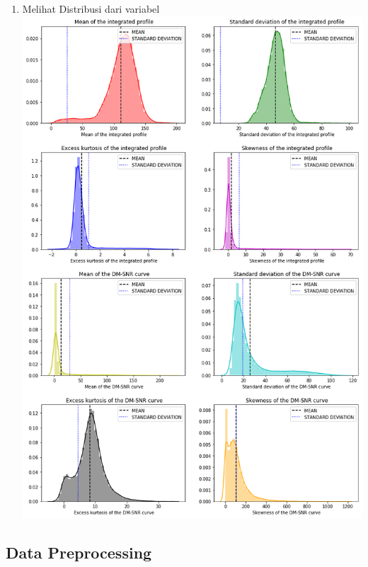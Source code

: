 \documentclass[12pt]{article}
\begin{document}
\begin{enumerate}
        \item Melihat Distribusi dari variabel
        \newline \includegraphics[scale=0.475]{data-distribution.png}
    
    \end{enumerate}
    
    \newpage
    
    \subsection{Data Preprocessing}
    
\end{document}
